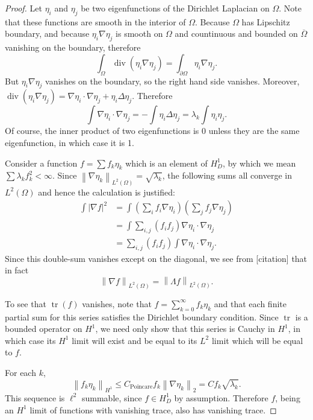 \documentclass[11pt]{amsart}
\theoremstyle{remark}
\theoremstyle{definition}
\newcommand{\norm}[1]{\left\lVert#1\right\rVert}
\newcommand{\paren}[1]{\left( #1 \right)}
\newcommand{\abs}[1]{\left\lvert #1 \right\rvert}
\DeclareMathOperator{\trace}{tr}
\newcommand{\del}{\partial}
\newcommand{\grad}{\nabla}
\renewcommand{\div}{\operatorname{div}}
\newcommand{\Laplace}{\Delta}
\newcommand{\eigen}[1]{\eta_{#1}} %
\begin{document}
\begin{proof}
Let $\eigen{i}$ and $\eigen{j}$ be two eigenfunctions of the Dirichlet Laplacian on $\Omega$.  Note that these functions are smooth in the interior of $\Omega$.  Because $\Omega$ has Lipschitz boundary, and because $\eigen{i} \grad \eigen{j}$ is smooth on $\Omega$ and countinuous and bounded on $\overline{\Omega}$ vanishing on the boundary, therefore 
\[ \int_\Omega \div(\eigen{i} \grad \eigen{j}) = \int_{\del \Omega} \eigen{i} \grad \eigen{j}. \]
But $\eigen{i} \grad \eigen{j}$ vanishes on the boundary, so the right hand side vanishes.  Moreover, $\div(\eigen{i} \grad \eigen{j}) = \grad \eigen{i} \cdot \grad \eigen{j} + \eigen{i} \Laplace \eigen{j}$.  Therefore
\[ \int \grad \eigen{i} \cdot \grad \eigen{j} = - \int \eigen{i} \Laplace \eigen{j} = \lambda_k \int \eigen{i} \eigen{j}. \]
Of course, the inner product of two eigenfunctions is 0 unless they are the same eigenfunction, in which case it is 1.  

Consider a function $f = \sum f_k \eigen{k}$ which is an element of $H_D^1$, by which we mean $\sum \lambda_k f_k^2 < \infty$.  Since $\norm{\grad \eigen{k}}_{L^2(\Omega)} = \sqrt{\lambda_k}$, the following sums all converge in $L^2(\Omega)$ and hence the calculation is justified:
\begin{align*}
\int \abs{\grad f}^2 &= \int \paren{\sum_i f_i \grad \eigen{i} } \paren{\sum_j f_j \grad \eigen{j}}
\\ &= \int \sum_{i,j} (f_i f_j) \grad \eigen{i} \cdot \grad \eigen{j}
\\ &= \sum_{i,j} (f_i f_j) \int \grad \eigen{i} \cdot \grad \eigen{j}.
\end{align*}
Since this double-sum vanishes except on the diagonal, we see from [citation] that in fact
\[ \norm{\grad f}_{L^2(\Omega)} = \norm{\Lambda f}_{L^2(\Omega)}. \]

To see that $\trace(f)$ vanishes, note that $f = \sum_{k=0}^\infty f_k \eigen{k}$ and that each finite partial sum for this series satisfies the Dirichlet boundary condition.  Since $\trace$ is a bounded operator on $H^1$, we need only show that this series is Cauchy in $H^1$, in which case its $H^1$ limit will exist and be equal to its $L^2$ limit which will be equal to $f$.  

For each $k$,
\[ \norm{ f_k \eigen{k} }_{H^1} \leq C_\textrm{Poincare} f_k \norm{\grad \eigen{k}}_2 = C f_k \sqrt{\lambda_k}. \]
This sequence is $\ell^2$ summable, since $f \in H_D^1$ by assumption.  Therefore $f$, being an $H^1$ limit of functions with vanishing trace, also has vanishing trace.  
\end{proof}
\end{document}
